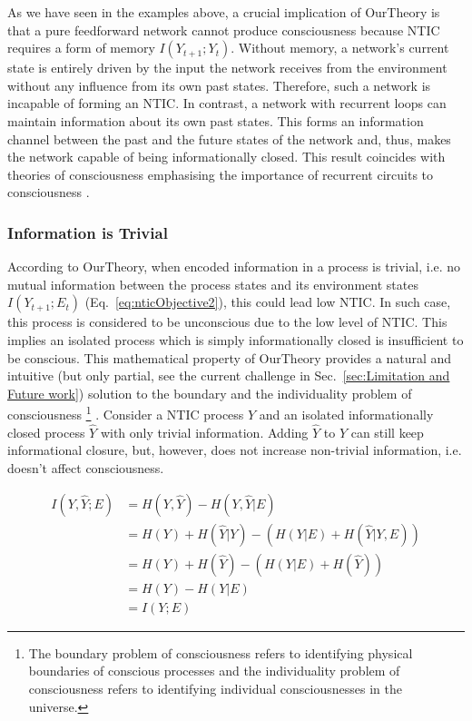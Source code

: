 \documentclass[utf8]{article}
\begin{document}
        		As we have seen in the examples above, a crucial implication of \ac{OurTheory} is that a pure feedforward network cannot produce consciousness because NTIC requires a form of memory $I(Y_{t+1};Y_{t})$. Without memory, a network's current state is entirely driven by the input the network receives from the environment without any influence from its own past states. Therefore, such a network is incapable of forming an NTIC. In contrast, a network with recurrent loops can maintain information about its own past states. This forms an information channel between the past and the future states of the network and, thus, makes the network capable of being informationally closed. This result coincides with theories of consciousness emphasising the importance of recurrent circuits to consciousness \citep{lamme2006towards, edelman1992bright, tononi2008neural}.

            \subsubsection*{Information is Trivial}
                According to \ac{OurTheory}, when encoded information in a process is trivial, i.e. no mutual information between the process states and its environment states $I(Y_{t+1};E_{t})$ (Eq.~\ref{eq:nticObjective2}), this could lead low NTIC. In such case, this process is considered to be unconscious due to the low level of NTIC. This implies an isolated process which is simply informationally closed is insufficient to be conscious. 
                This mathematical property of \ac{OurTheory} provides a natural and intuitive (but only partial, see the current challenge in  Sec.~\ref{sec:Limitation and Future work}) solution to the boundary and the individuality problem of consciousness
                    \footnote{The boundary problem of consciousness refers to identifying physical boundaries of conscious processes and the individuality problem of consciousness refers to identifying individual consciousnesses in the universe.}
                \citep{Raymont2006-RAYUOC}. Consider a NTIC process $Y$ and an isolated informationally closed process $\hat{Y}$ with only trivial information. Adding $\hat{Y}$ to $Y$ can still keep informational closure, but, however, does not increase non-trivial information, i.e. doesn't affect consciousness. 
                
    			\begin{equation}
    			    \begin{aligned}
                        I(Y,\hat{Y};E) & = H(Y,\hat{Y}) - H(Y,\hat{Y}|E) \\
                                       & = H(Y) + H(\hat{Y}|Y) - (H(Y|E)+H(\hat{Y}|Y,E)) \\
                                       & = H(Y) + H(\hat{Y}) - (H(Y|E)+H(\hat{Y})) \\
                                       & = H(Y) - H(Y|E)\\
                                       & = I(Y;E)				
    				\end{aligned}
    			\end{equation}
                
\end{document}
